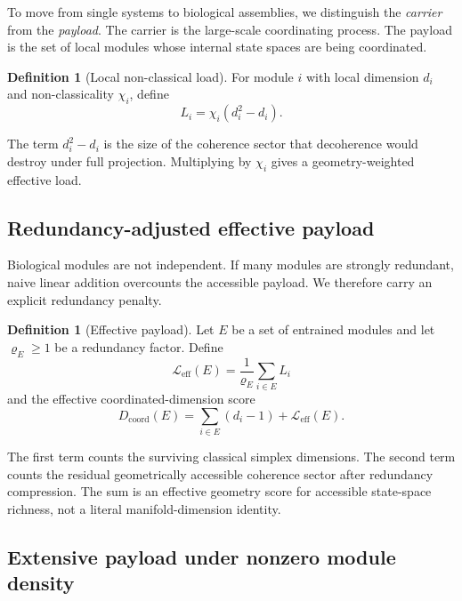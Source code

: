 \documentclass[11pt,a4paper]{article}
\theoremstyle{definition}
\newtheorem{definition}[theorem]{Definition}
\theoremstyle{remark}
\begin{document}
To move from single systems to biological assemblies, we distinguish the \emph{carrier} from the \emph{payload}. The carrier is the large-scale coordinating process. The payload is the set of local modules whose internal state spaces are being coordinated.

\begin{definition}[Local non-classical load]
\label{def:local-load}
For module $i$ with local dimension $d_i$ and non-classicality $\chi_i$, define
\begin{equation}
\label{eq:local-load}
L_i=\chi_i(d_i^2-d_i).
\end{equation}
\end{definition}

The term $d_i^2-d_i$ is the size of the coherence sector that decoherence would destroy under full projection. Multiplying by $\chi_i$ gives a geometry-weighted effective load.

\subsection{Redundancy-adjusted effective payload}

Biological modules are not independent. If many modules are strongly redundant, naive linear addition overcounts the accessible payload. We therefore carry an explicit redundancy penalty.

\begin{definition}[Effective payload]
\label{def:payload}
Let $E$ be a set of entrained modules and let $\varrho_E\ge 1$ be a redundancy factor. Define
\begin{equation}
\label{eq:payload}
\mathcal{L}_{\mathrm{eff}}(E)=\frac{1}{\varrho_E}\sum_{i\in E}L_i
\end{equation}
and the effective coordinated-dimension score
\begin{equation}
\label{eq:dcoord}
D_{\mathrm{coord}}(E)=\sum_{i\in E}(d_i-1)+\mathcal{L}_{\mathrm{eff}}(E).
\end{equation}
\end{definition}

The first term counts the surviving classical simplex dimensions. The second term counts the residual geometrically accessible coherence sector after redundancy compression. The sum is an effective geometry score for accessible state-space richness, not a literal manifold-dimension identity.

\subsection{Extensive payload under nonzero module density}
\end{document}

